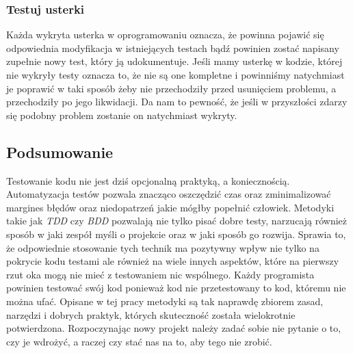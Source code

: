   \subsubsection{Testuj usterki}
  Każda wykryta usterka w oprogramowaniu oznacza, że powinna pojawić się odpowiednia modyfikacja w istniejących testach bądź powinien zostać napisany zupełnie nowy test, który ją udokumentuje. Jeśli mamy usterkę w kodzie, której nie wykryły testy oznacza to, że nie są one kompletne i powinniśmy natychmiast je poprawić w taki sposób żeby nie przechodziły przed usunięciem problemu, a przechodziły po jego likwidacji. Da nam to pewność, że jeśli w przyszłości zdarzy się podobny problem zostanie on natychmiast wykryty.
  
  \subsection{Podsumowanie}
  
  Testowanie kodu nie jest dziś opcjonalną praktyką, a koniecznością. Automatyzacja testów pozwala znacząco oszczędzić czas oraz zminimalizować margines błędów oraz niedopatrzeń jakie mógłby popełnić człowiek. Metodyki takie jak \emph{TDD} czy \emph{BDD} pozwalają nie tylko pisać dobre testy, narzucają również sposób w jaki zespół myśli o projekcie oraz w jaki sposób go rozwija. Sprawia to, że odpowiednie stosowanie tych technik ma pozytywny wpływ nie tylko na pokrycie kodu testami ale również na wiele innych aspektów, które na pierwszy rzut oka mogą nie mieć z testowaniem nic wspólnego. Każdy programista powinien testować swój kod ponieważ kod nie przetestowany to kod, któremu nie można ufać. Opisane w tej pracy metodyki są tak naprawdę zbiorem zasad, narzędzi i dobrych praktyk, których skuteczność została wielokrotnie potwierdzona. Rozpoczynając nowy projekt należy zadać sobie nie pytanie o to, czy je wdrożyć, a raczej czy stać nas na to, aby tego nie zrobić.
  